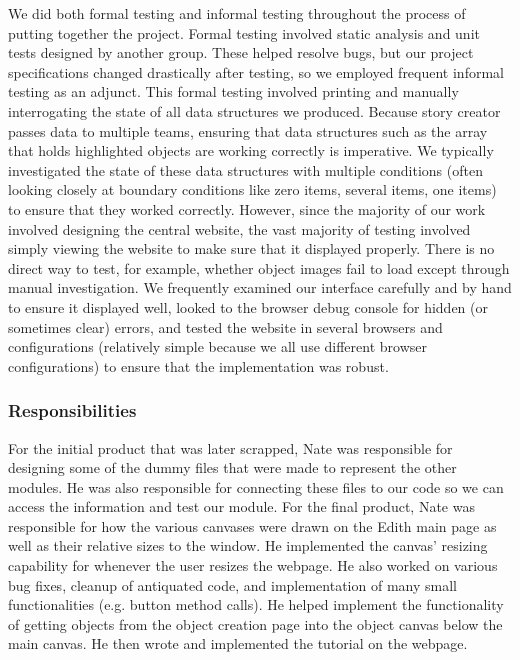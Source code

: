 \documentclass[12pt]{article}
\begin{document}
We did both formal testing and informal testing throughout the process of putting together the project. Formal testing involved static analysis and unit tests designed by another group. These helped resolve bugs, but our project specifications changed drastically after testing, so we employed frequent informal testing as an adjunct. This formal testing involved printing and manually interrogating the state of all data structures we produced. Because story creator passes data to multiple teams, ensuring that data structures such as the array that holds highlighted objects are working correctly is imperative. We typically investigated the state of these data structures with multiple conditions (often looking closely at boundary conditions like zero items, several items, one items) to ensure that they worked correctly. However, since the majority of our work involved designing the central website, the vast majority of testing involved simply viewing the website to make sure that it displayed properly. There is no direct way to test, for example, whether object images fail to load except through manual investigation. We frequently examined our interface carefully and by hand to ensure it displayed well, looked to the browser debug console for hidden (or sometimes clear) errors, and tested the website in several browsers and configurations (relatively simple because we all use different browser configurations) to ensure that the implementation was robust. \\

\subsubsection{Responsibilities}

For the initial product that was later scrapped, Nate was responsible for designing some of the dummy files that were made to represent the other modules. He was also responsible for connecting these files to our code so we can access the information and test our module. For the final product, Nate was responsible for how the various canvases were drawn on the Edith main page as well as their relative sizes to the window. He implemented the canvas' resizing capability for whenever the user resizes the webpage. He also worked on various bug fixes, cleanup of antiquated code, and implementation of many small functionalities (e.g. button method calls). He helped implement the functionality of getting objects from the object creation page into the object canvas below the main canvas. He then wrote and implemented the tutorial on the webpage. \\
\end{document}

